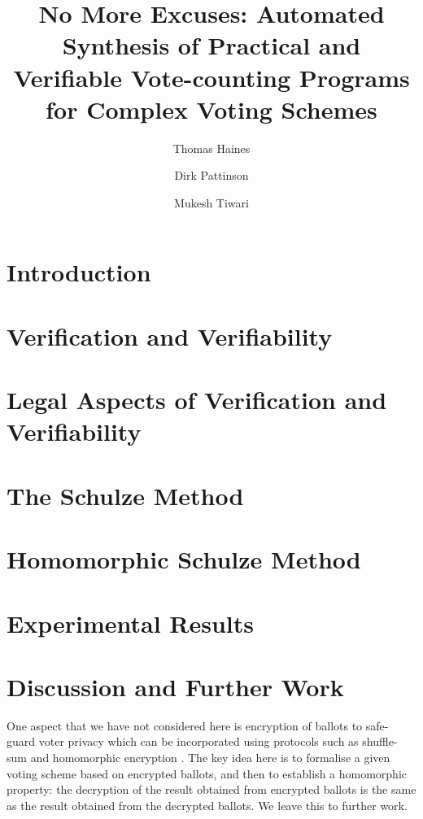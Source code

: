 \documentclass{llncs}
\begin{document}
\title{No More Excuses: Automated Synthesis of Practical and
Verifiable Vote-counting Programs for Complex Voting Schemes}

\author{Thomas Haines  \and
      Dirk Pattinson \and Mukesh Tiwari }
\maketitle

\begin{abstract}


\end{abstract}


\section{Introduction}


\section{Verification and Verifiability} \label{sec:verif}


\section{Legal Aspects of Verification and Verifiability}






\section{The Schulze Method} \label{sec:schulze}

\section{Homomorphic Schulze Method} \label{sec:schulze}


\section{Experimental Results}


\section{Discussion and Further Work}



One aspect that we have not considered here is encryption of
ballots to safe-guard voter privacy which can be incorporated using
protocols such as shuffle-sum \cite{Benaloh:2009:SSC} and
homomorphic encryption \cite{Yi:2014:HEA}. The key idea here is to
formalise a given voting scheme based on encrypted ballots, and then
to establish a homomorphic property: the decryption of the result
obtained from encrypted ballots is the same as the result obtained from
the decrypted ballots.  We leave this to further work.



\end{document}
